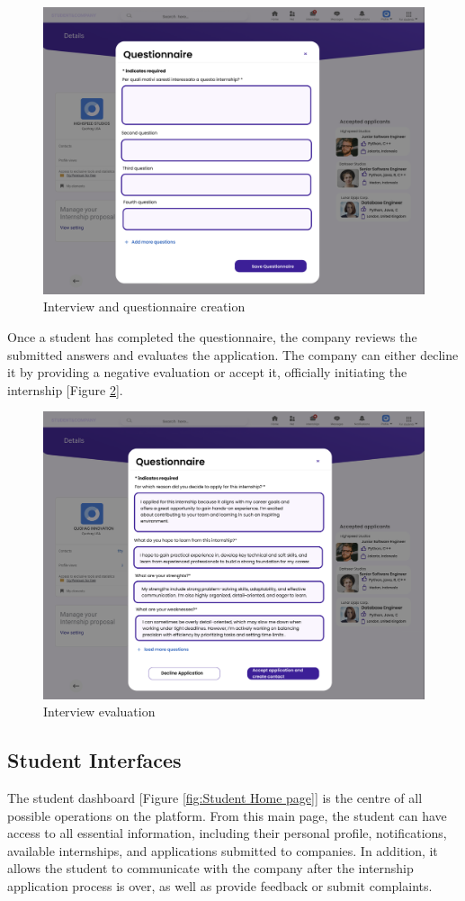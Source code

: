 \begin{figure} [H]
    \centering
    \includegraphics[width=0.5\linewidth]{Interface Images/company interface/Screenshot 2024-12-12 045749.png}
    \caption{Interview and questionnaire creation}
    \label{fig:Interview and questionnaire creation}
\end{figure}

Once a student has completed the questionnaire, the company reviews the submitted answers and evaluates the application. The company can either decline it by providing a negative evaluation or accept it, officially initiating the internship [Figure \ref{fig:Interviews evaluation}].

\begin{figure} [H]
    \centering
    \includegraphics[width=0.5\linewidth]{Interface Images/company interface/Screenshot 2024-12-12 045902.png}
    \caption{Interview evaluation}
    \label{fig:Interviews evaluation}
\end{figure}


\subsection{Student Interfaces}

The student dashboard [Figure \ref{fig:Student Home page}] is the centre of all possible operations on the platform. From this main page, the student can have access to all essential information,
including their personal profile, notifications, available internships, and applications submitted to companies. In addition, it allows the student to communicate with the company after the internship application process is over, as well as provide feedback or submit complaints.

